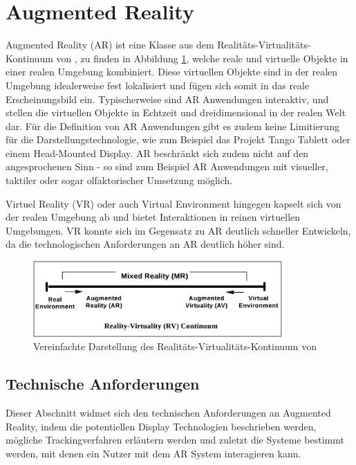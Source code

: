 
\section{Augmented Reality}

Augmented Reality (AR) ist eine Klasse aus dem Realitäts-Virtualitäts-Kontinuum von \cite{milgram1995augmented}, zu finden in Abbildung \ref{fig:virtual-continuum}, welche reale und virtuelle Objekte in einer realen Umgebung kombiniert. Diese virtuellen Objekte sind in der realen Umgebung idealerweise fest lokalisiert und fügen sich somit in das reale Erscheinungsbild ein. Typischerweise sind AR Anwendungen interaktiv, und stellen die virtuellen Objekte in Echtzeit und dreidimensional in der realen Welt dar. Für die Definition von AR Anwendungen gibt es zudem keine Limitierung für die Darstellungstechnologie, wie zum Beispiel das Projekt Tango Tablett oder einem Head-Mounted Display. AR beschränkt sich zudem nicht auf den angesprochenen Sinn - so sind zum Beispiel AR Anwendungen mit visueller, taktiler oder sogar olfaktorischer Umsetzung möglich.

Virtuel Reality (VR) oder auch Virtual Environment hingegen kapselt sich von der realen Umgebung ab und bietet Interaktionen in reinen virtuellen Umgebungen. VR konnte sich im Gegensatz zu AR deutlich schneller Entwickeln, da die technologischen Anforderungen an AR deutlich höher sind. \citep{van2010survey}

\begin{figure}
  \centering
	\includegraphics[width=0.85\textwidth]{content/images/theory/virtual-continuum.png} 
  \caption{Vereinfachte Darstellung des Realitäts-Virtualitäts-Kontinuum von \citet*{milgram1995augmented}}
  \label{fig:virtual-continuum}
\end{figure}

\subsection{Technische Anforderungen}

Dieser Abschnitt widmet sich den technischen Anforderungen an Augmented Reality, indem die potentiellen Display Technologien beschrieben werden, mögliche Trackingverfahren erläutern werden und zuletzt die Systeme bestimmt werden, mit denen ein Nutzer mit dem AR System interagieren kann.

